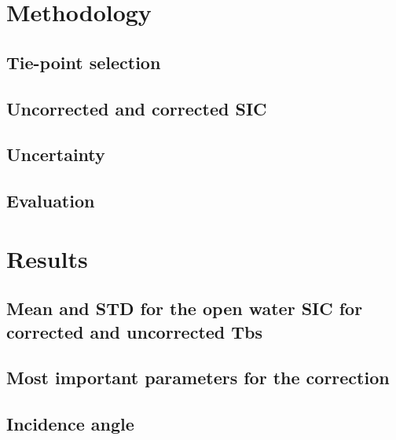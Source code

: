 \documentclass{article}
\begin{document}
\section{Methodology} %

\subsection{Tie-point selection}

\subsection{Uncorrected and corrected SIC}

\subsection{Uncertainty}

\subsection{Evaluation}

\section{Results}

\subsection{Mean and STD for the open water SIC for corrected and uncorrected Tbs}

\subsection{Most important parameters for the correction} %

\subsection{Incidence angle}
\end{document}
